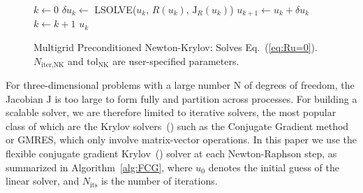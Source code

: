 %
\begin{figure}[ht!]
\begin{algorithm}[H]
  \caption{\label{alg:newtonraphson}
    Multigrid Preconditioned Newton-Krylov: Solves Eq.~(\ref{eq:Ru=0}).$N_{\text{iter,NK}}$ and $\text{tol}_{\text{NK}}$ are user-specified parameters.
 }
    \begin{algorithmic}[1]
      \State $k \leftarrow 0$
       \State  $\delta u_k\leftarrow $ LSOLVE($u_k$, $R(u_k)$, $\mathrm{J}_R(u_k)$) 
       \State $u_{k+1} \leftarrow u_k + \delta u_k$
       \State $k \leftarrow k + 1$
       \EndWhile
       \State \Return $u_{k}$
      \EndProcedure 
    \end{algorithmic}
\end{algorithm}
\end{figure}

For three-dimensional problems with a large number $\mathrm{N}$ of
degrees of freedom, the Jacobian $\mathrm{J}$ is too large to form fully and partition across processes. For
building a scalable solver, we are therefore limited to iterative
solvers, the most popular class of which are the Krylov
solvers~(\cite{saad2003iterative}) such as the Conjugate Gradient method or GMRES,
which only involve matrix-vector operations. In this paper we use the
flexible conjugate gradient Krylov~(\cite{notay2000flexible}) solver at each
Newton-Raphson step, as summarized in Algorithm~\ref{alg:FCG}, where
$u_0$ denotes the initial guess of the linear solver, and
$N_{\text{its}}$ is the number of iterations.

